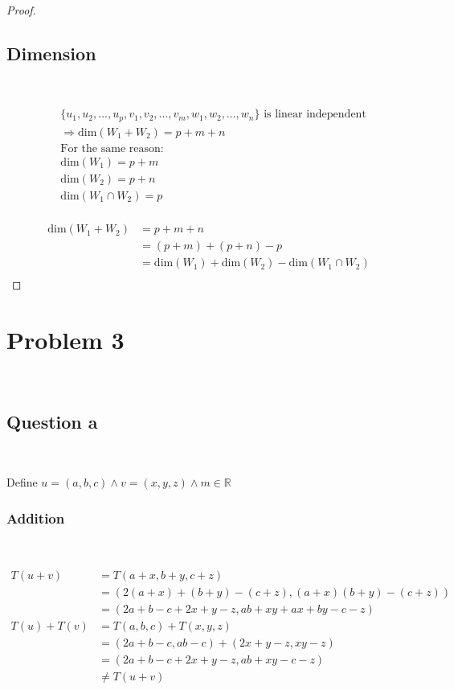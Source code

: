 \documentclass{article}
\def\R{\mathbb{R}}
\begin{document}
\begin{proof}
\subsection{Dimension}

~

\begin{equation}
\tag{2.2-1}
\begin{split}
&\{u_1,u_2,...,u_p,v_1,v_2,...,v_m,w_1,w_2,...,w_n\} \text{ is linear independent}\\
&\Rightarrow \text{dim}(W_1+W_2)=p+m+n\\
&\text{For the same reason:}\\
&\text{dim}(W_1)=p+m\\
&\text{dim}(W_2)=p+n\\
&\text{dim}(W_1\cap W_2)=p\\
\end{split}
\end{equation}

\begin{equation}
\tag{2.2-2}
\begin{split}
\text{dim}(W_1+W_2)&=p+m+n\\
&=(p+m)+(p+n)-p\\
&=\text{dim}(W_1) + \text{dim}(W_2) -\text{dim}(W_1\cap W_2)\\
\end{split}
\end{equation}
\end{proof}

\newpage

\section{Problem 3}

~

\subsection{Question a}

~

Define $u=(a,b,c)\land v=(x,y,z)\land m\in\R$

\subsubsection{Addition}

~

\begin{equation}
\tag{3.1.1}
\begin{split}
T(u+v)&=T(a+x,b+y,c+z)\\
&=(2(a+x)+(b+y)-(c+z),(a+x)(b+y)-(c+z))\\
&=(2a+b-c+2x+y-z,ab+xy+ax+by-c-z)\\
T(u)+T(v)&=T(a,b,c)+T(x,y,z)\\
&=(2a+b-c,ab-c)+(2x+y-z,xy-z)\\
&=(2a+b-c+2x+y-z,ab+xy-c-z)\\
&\ne T(u+v)\\
\end{split}
\end{equation}
\end{document}
